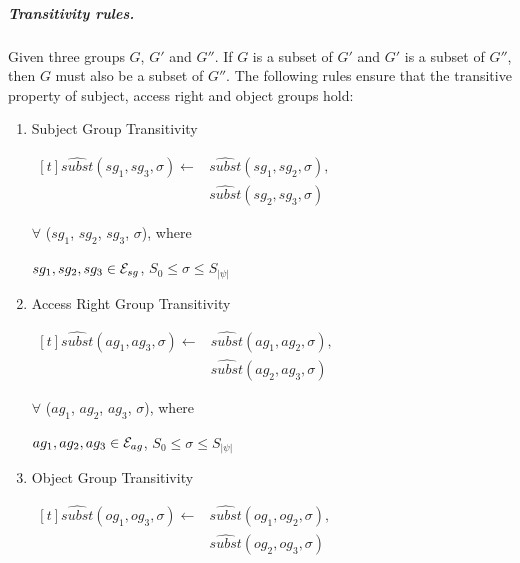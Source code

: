 \documentclass[10pt, twocolumn]{article}
\begin{document}
          \subparagraph{Transitivity rules.}

            Given three groups $G$, $G'$ and $G''$. If $G$ is a subset of $G'$
            and $G'$ is a subset of $G''$, then $G$ must also be a subset of
            $G''$. The following rules ensure that the transitive property of
            subject, access right and object groups hold:

            \begin{enumerate}
              \item
                Subject Group Transitivity

                \begin{math}
                  \begin{aligned}[t]
                    \hat{subst}(sg_{1}, sg_{3}, \sigma) \leftarrow &
                    \hat{subst}(sg_{1}, sg_{2}, \sigma), \\
                    & \hat{subst}(sg_{2}, sg_{3}, \sigma)
                  \end{aligned}
                \end{math}

                $\forall$ ($sg_{1}$, $sg_{2}$, $sg_{3}$, $\sigma$), where

                $sg_{1}, sg_{2}, sg_{3} \in {\cal E}_{sg}$,
                $S_{0} \leq \sigma \leq S_{|\psi|}$

              \item
                Access Right Group Transitivity

                \begin{math}
                  \begin{aligned}[t]
                    \hat{subst}(ag_{1}, ag_{3}, \sigma) \leftarrow &
                    \hat{subst}(ag_{1}, ag_{2}, \sigma), \\
                    & \hat{subst}(ag_{2}, ag_{3}, \sigma)
                  \end{aligned}
                \end{math}

                $\forall$ ($ag_{1}$, $ag_{2}$, $ag_{3}$, $\sigma$), where

                $ag_{1}, ag_{2}, ag_{3} \in {\cal E}_{ag}$,
                $S_{0} \leq \sigma \leq S_{|\psi|}$

              \item
                Object Group Transitivity

                \begin{math}
                  \begin{aligned}[t]
                    \hat{subst}(og_{1}, og_{3}, \sigma) \leftarrow &
                    \hat{subst}(og_{1}, og_{2}, \sigma), \\
                    & \hat{subst}(og_{2}, og_{3}, \sigma)
                  \end{aligned}
                \end{math}


\end{enumerate}
\end{document}
